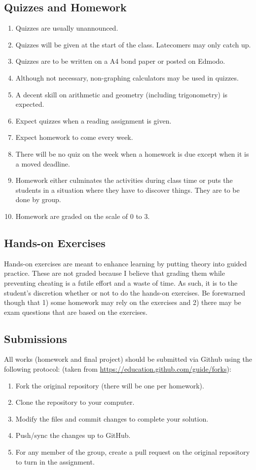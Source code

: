 \documentclass[10pt]{article}
\begin{document}
\subsection{Quizzes and Homework}
\begin{enumerate}[noitemsep]
\item Quizzes are usually unannounced.
\item Quizzes will be given at the start of the class. Latecomers may only catch up.
\item Quizzes are to be written on a A4 bond paper or posted on Edmodo.
\item Although not necessary, non-graphing calculators may be used in quizzes.
\item A decent skill on arithmetic and geometry (including trigonometry) is expected.
\item Expect quizzes when a reading assignment is given.
\item Expect homework to come every week.
\item There will be no quiz on the week when a homework is due except when it is a moved deadline.
\item Homework either culminates the activities during class time or puts the students in a situation where they have to discover things. They are to be done by group.
\item Homework are graded on the scale of 0 to 3.
\end{enumerate}

\subsection{Hands-on Exercises}
Hands-on exercises are meant to enhance learning by putting theory into guided practice. These are not graded because I believe that grading them while preventing cheating is a futile effort and a waste of time. As such, it is to the student's discretion whether or not to do the hands-on exercises. Be forewarned though that 1) some homework may rely on the exercises and 2) there may be exam questions that are based on the exercises.

\subsection{Submissions}
All works (homework and final project) should be submitted via Github using the following protocol: (taken from \url{https://education.github.com/guide/forks}):
\begin{enumerate}[noitemsep]
	\item Fork the original repository (there will be one per homework).
	\item Clone the repository to your computer.
	\item Modify the files and commit changes to complete your solution.
	\item Push/sync the changes up to GitHub.
	\item For any member of the group, create a pull request on the original repository to turn in the assignment.
\end{enumerate}
\end{document}
